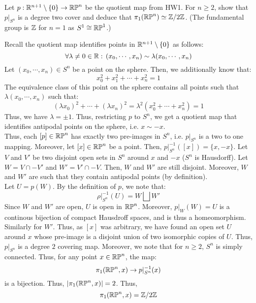 \documentclass[12pt]{article}
\begin{document}


\begin{problem}{1}
    Let $p: \mathbb R^{n+1} \setminus \{0\} \to \mathbb{RP}^n$ be the quotient map from HW1. For $n \geq 2$, show that $p|_{S^n}$ is a degree two cover and deduce that $\pi_1(\mathbb{RP}^n) \simeq \mathbb{Z}/2\mathbb{Z}$. (The fundamental group is $\mathbb{Z}$ for $n=1$ as $S^1 \cong \mathbb{RP}^1$.)
\end{problem}
\begin{solution}
    Recall the quotient map identifies points in $\mathbb R^{n+1} \setminus \{0\}$ as follows: 
    \[ \forall \lambda \neq 0 \in \mathbb R: \, (x_0, \cdots, x_n) \sim \lambda (x_0, \cdots, x_n)\]
    Let $(x_0, \cdots, x_n) \in S^n$ be a point on the sphere. Then, we additionally know that:
    \[ x_0^2 + x_1^2 + \cdots + x_n^2 = 1\]
    The equivalence class of this point on the sphere contains all points such that $\lambda(x_0, \cdots, x_n)$ such that:
    \[ (\lambda x_0)^2 + \cdots + (\lambda x_n)^2 = \lambda^2 (x_0^2 + \cdots + x_n^2) = 1\]
    Thus, we have $\lambda = \pm 1$. Thus, restricting $p$ to $S^n$, we get a quotient map that identifies antipodal points on the sphere, i.e. $x \sim -x$. \\
    Thus, each $[p] \in \mathbb{RP}^n$ has exactly two pre-images in $S^n$, i.e. $p|_{S^n}$ is a two to one mapping. \bbni
    Moreover, let $[x] \in \mathbb{RP}^n$ be a point. Then, $p|_{S^n}^{-1}([x]) = \{x, -x\}$. Let $V$ and $V'$ be two disjoint open sets in $S^n$ around $x$ and $-x$ ($S^n$ is Hausdorff). Let $W = V \cap -V'$ and $W' = V' \cap -V$. Then, $W$ and $W'$ are still disjoint. Moreover, $W$ and $W'$ are such that they contain antipodal points (by definition). \\
    Let $U = p(W)$. By the definition of $p$, we note that:
    \[ \rho|_{S^n}^{-1}(U) = W \bigsqcup W'\]
    Since $W$ and $W'$ are open, $U$ is open in $\mathbb{RP}^n$. Moreover, $p|_W(W) = U$ is a continous bijection of compact Hausdroff spaces, and is thus a homeomorphism. Similarly for $W'$. Thus, as $[x]$ was arbitrary, we have found an open set $U$ around $x$ whose pre-image is a disjoint union of two isomorphic copies of $U$. Thus, $p|_{S^n}$ is a degree $2$ covering map. \bbni 
    Moreover, we note that for $n \geq 2$, $S^n$ is simply connected. Thus, for any point $x \in \mathbb{RP}^n$, the map: 
    \[ \pi_1(\mathbb{RP}^n, x) \to p|_{S^n}^{-1}(x)\]
    is a bijection. Thus, $|\pi_1(\mathbb{RP}^n, x)| = 2$. Thus, 
    \[ \pi_1(\mathbb{RP}^n, x) = \mathbb Z/2\mathbb Z\]

\end{solution}
\newpage
\end{document}

